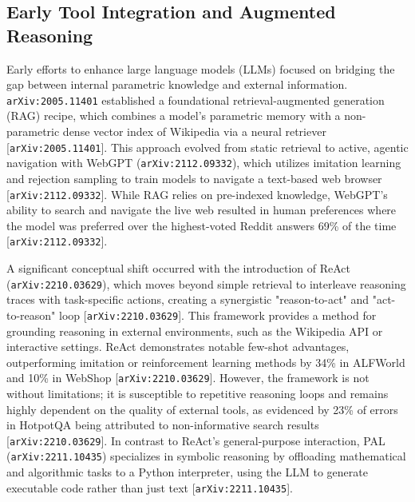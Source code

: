 \documentclass[11pt]{article}
\begin{document}
\subsection{Early Tool Integration and Augmented Reasoning}

Early efforts to enhance large language models (LLMs) focused on bridging the gap between internal parametric knowledge and external information. \texttt{arXiv:2005.11401} established a foundational retrieval-augmented generation (RAG) recipe, which combines a model's parametric memory with a non-parametric dense vector index of Wikipedia via a neural retriever [\texttt{arXiv:2005.11401}]. This approach evolved from static retrieval to active, agentic navigation with WebGPT (\texttt{arXiv:2112.09332}), which utilizes imitation learning and rejection sampling to train models to navigate a text-based web browser [\texttt{arXiv:2112.09332}]. While RAG relies on pre-indexed knowledge, WebGPT’s ability to search and navigate the live web resulted in human preferences where the model was preferred over the highest-voted Reddit answers 69\% of the time [\texttt{arXiv:2112.09332}].

A significant conceptual shift occurred with the introduction of ReAct (\texttt{arXiv:2210.03629}), which moves beyond simple retrieval to interleave reasoning traces with task-specific actions, creating a synergistic "reason-to-act" and "act-to-reason" loop [\texttt{arXiv:2210.03629}]. This framework provides a method for grounding reasoning in external environments, such as the Wikipedia API or interactive settings. ReAct demonstrates notable few-shot advantages, outperforming imitation or reinforcement learning methods by 34\% in ALFWorld and 10\% in WebShop [\texttt{arXiv:2210.03629}]. However, the framework is not without limitations; it is susceptible to repetitive reasoning loops and remains highly dependent on the quality of external tools, as evidenced by 23\% of errors in HotpotQA being attributed to non-informative search results [\texttt{arXiv:2210.03629}]. In contrast to ReAct's general-purpose interaction, PAL (\texttt{arXiv:2211.10435}) specializes in symbolic reasoning by offloading mathematical and algorithmic tasks to a Python interpreter, using the LLM to generate executable code rather than just text [\texttt{arXiv:2211.10435}].
\end{document}
